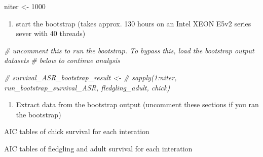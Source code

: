 \documentclass[]{article}
\newenvironment{Shaded}{\begin{snugshade}}{\end{snugshade}}
\newcommand{\DecValTok}[1]{\textcolor[rgb]{0.00,0.00,0.81}{{#1}}}
\newcommand{\StringTok}[1]{\textcolor[rgb]{0.31,0.60,0.02}{{#1}}}
\newcommand{\CommentTok}[1]{\textcolor[rgb]{0.56,0.35,0.01}{\textit{{#1}}}}
\newcommand{\NormalTok}[1]{{#1}}
\providecommand{\tightlist}{%
  \setlength{\itemsep}{0pt}\setlength{\parskip}{0pt}}
\begin{document}
\begin{Shaded}
\begin{Highlighting}[]
\NormalTok{niter <-}\StringTok{ }\DecValTok{1000}
\end{Highlighting}
\end{Shaded}

\begin{enumerate}
\def\labelenumi{\Alph{enumi})}
\setcounter{enumi}{4}
\tightlist
\item
  start the bootstrap (takes approx. 130 hours on an Intel XEON E5v2
  series sever with 40 threads)
\end{enumerate}

\begin{Shaded}
\begin{Highlighting}[]
\CommentTok{# uncomment this to run the bootstrap. To bypass this, load the bootstrap output datasets }
\CommentTok{# below to continue analysis}

\CommentTok{# survival_ASR_bootstrap_result <- }
\CommentTok{#   sapply(1:niter, run_bootstrap_survival_ASR, fledgling_adult, chick)}
\end{Highlighting}
\end{Shaded}

\begin{enumerate}
\def\labelenumi{\Alph{enumi})}
\setcounter{enumi}{5}
\tightlist
\item
  Extract data from the bootstrap output (uncomment these sections if
  you ran the bootstrap)
\end{enumerate}

AIC tables of chick survival for each interation

\begin{Shaded}
\end{Shaded}

AIC tables of fledgling and adult survival for each interation

\begin{Shaded}
\end{Shaded}
\end{document}
